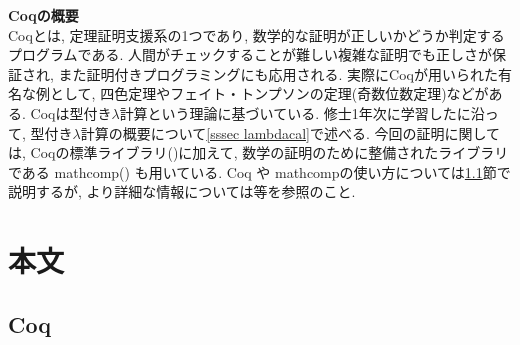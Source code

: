 \documentclass[11pt]{jarticle}
\theoremstyle{mystyle}
\newcommand{\0}{\textbf{0}}
\newcommand{\1}{\textbf{1}}
\newcommand{\2}{\textbf{2}}
\begin{document}
\textbf{Coqの概要}\\
Coqとは, 定理証明支援系の1つであり, 数学的な証明が正しいかどうか判定するプログラムである.
人間がチェックすることが難しい複雑な証明でも正しさが保証され, また証明付きプログラミングにも応用される. 実際にCoqが用いられた有名な例として, 四色定理やフェイト・トンプソンの定理(奇数位数定理)などがある. Coqは型付き$\lambda$計算という理論に基づいている. 修士1年次に学習した\cite{Bar}に沿って, 型付き$\lambda$計算の概要について\ref{sssec lambdacal}で述べる. 
今回の証明に関しては, Coqの標準ライブラリ(\cite{coq sl})に加えて, 数学の証明のために整備されたライブラリである mathcomp(\cite{coq mc}) も用いている. Coq や mathcompの使い方については\ref{ssec Coq}節で説明するが, より詳細な情報については\cite{Hag}等を参照のこと. 

\section{本文}
\subsection{Coq} \label{ssec Coq}
\end{document}
